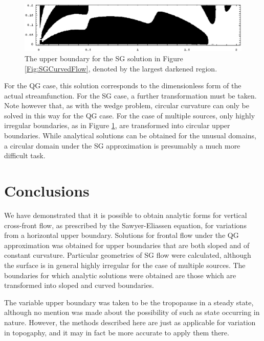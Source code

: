 \documentclass[11pt,onecolumn,oneside]{article}
\begin{document}
\begin{figure}
\centering
\includegraphics[width=4.9in]{img/sg_curve_3src_surface.eps}
\caption{\small The upper boundary for the SG solution in Figure \ref{Fig:SGCurvedFlow}, denoted by the largest darkened region.}
\label{Fig:SGCurvedBoundary}
\end{figure}

For the QG case, this solution corresponds to the dimensionless form of the actual streamfunction. For the SG case, a further transformation must be taken. Note however that, as with the wedge problem, circular curvature can only be solved in this way for the QG case. For the case of multiple sources, only highly irregular boundaries, as in Figure \ref{Fig:SGCurvedBoundary}, are transformed into circular upper boundaries. While analytical solutions can be obtained for the unusual domains, a circular domain under the SG approximation is presumably a much more difficult task.


\section{Conclusions}

We have demonstrated that it is possible to obtain analytic forms for vertical cross-front flow, as prescribed by the Sawyer-Eliassen equation, for variations from a horizontal upper boundary. Solutions for frontal flow under the QG approximation was obtained for upper boundaries that are both sloped and of constant curvature. Particular geometries of SG flow were calculated, although the surface is in general highly irregular for the case of multiple sources. The boundaries for which analytic solutions were obtained are those which are transformed into sloped and curved boundaries.

The variable upper boundary was taken to be the tropopause in a steady state, although no mention was made about the possibility of such as state occurring in nature. However, the methods described here are just as applicable for variation in topogaphy, and it may in fact be more accurate to apply them there.
\end{document}
